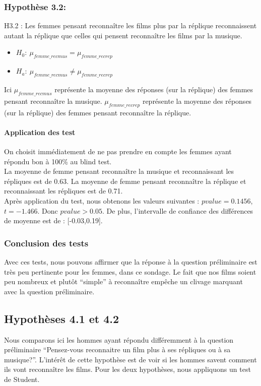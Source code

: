 \documentclass{article} %
\begin{document}
\subsubsection{Hypothèse 3.2:}
H3.2 : Les femmes pensant reconnaître les films plus par la réplique reconnaissent autant la réplique que celles qui pensent reconnaître les films par la musique.
\begin{itemize}
	\item $H_0: \ \mu_{femme\_recmus} = \mu_{femme\_recrep}$
	\item $H_a: \ \mu_{femme\_recmus} \ne \mu_{femme\_recrep}$
\end{itemize}

Ici $\mu_{femme\_recmus}$ représente la moyenne des réponses (sur la réplique) des femmes pensant reconnaître la musique. $\mu_{femme\_recrep}$ représente la moyenne des réponses (sur la réplique) des femmes pensant reconnaître la réplique.
\paragraph{ Application des test\\}
On choisit immédiatement de ne pas prendre en compte les femmes ayant répondu bon à 100\% au blind test.\\
La moyenne de femme pensant reconnaître la musique et reconnaissant les répliques est de 0.63. La moyenne de femme pensant reconnaître la réplique et reconnaissant les répliques est de 0.71.\\
Après application du test, nous obtenons les valeurs suivantes : $pvalue = 0.1456$, $t = -1.466$. Donc ${pvalue>0.05}$. De plus, l'intervalle de confiance des différences de moyenne est de : [-0.03,0.19].
\subsubsection{Conclusion des tests}
Avec ces tests, nous pouvons affirmer que la réponse à la question préliminaire est très peu pertinente pour les femmes, dans ce sondage. Le fait que nos films soient peu nombreux et plutôt “simple” à reconnaître empêche un clivage marquant avec la question préliminaire.

\subsection{Hypothèses 4.1 et 4.2}
Nous comparons ici les hommes ayant répondu différemment à la question préliminaire “Pensez-vous reconnaitre un film plus à ses répliques ou à sa musique?”. L’intérêt de cette hypothèse est de voir si les hommes savent comment ils vont reconnaître les films.
Pour les deux hypothèses, nous appliquons un test de Student.
\end{document}
